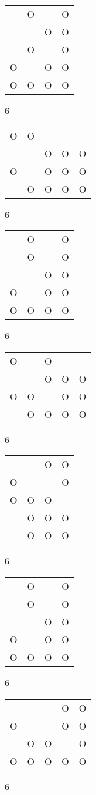 \begin{tabular}{|m{0.2cm}m{0.2cm}m{0.2cm}m{0.2cm}|}\hline
 &O& &O\\
 & &O&O\\
 &O& &O\\
O& &O&O\\
O&O&O&O\\
\hline\end{tabular}6
\begin{tabular}{|m{0.2cm}m{0.2cm}m{0.2cm}m{0.2cm}m{0.2cm}|}\hline
O&O& & & \\
 & &O&O&O\\
O& &O&O&O\\
 &O&O&O&O\\
\hline\end{tabular}6
\begin{tabular}{|m{0.2cm}m{0.2cm}m{0.2cm}m{0.2cm}|}\hline
 &O& &O\\
 &O& &O\\
 & &O&O\\
O& &O&O\\
O&O&O&O\\
\hline\end{tabular}6
\begin{tabular}{|m{0.2cm}m{0.2cm}m{0.2cm}m{0.2cm}m{0.2cm}|}\hline
O& &O& & \\
 & &O&O&O\\
O&O& &O&O\\
 &O&O&O&O\\
\hline\end{tabular}6
\begin{tabular}{|m{0.2cm}m{0.2cm}m{0.2cm}m{0.2cm}|}\hline
 & &O&O\\
O& & &O\\
O&O&O& \\
 &O&O&O\\
 &O&O&O\\
\hline\end{tabular}6
\begin{tabular}{|m{0.2cm}m{0.2cm}m{0.2cm}m{0.2cm}|}\hline
 &O& &O\\
 &O& &O\\
 & &O&O\\
O& &O&O\\
O&O&O&O\\
\hline\end{tabular}6
\begin{tabular}{|m{0.2cm}m{0.2cm}m{0.2cm}m{0.2cm}m{0.2cm}|}\hline
 & & &O&O\\
O& & &O&O\\
 &O&O& &O\\
O&O&O&O&O\\
\hline\end{tabular}6
